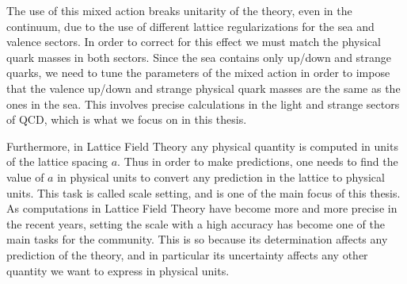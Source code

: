 The use of this mixed action breaks unitarity of the theory, even in the continuum, due to the use of different lattice regularizations for the sea and valence sectors. In order to correct for this effect we must match the physical quark masses in both sectors. Since the sea contains only up/down and strange quarks, we need to tune the parameters of the mixed action in order to impose that the valence up/down and strange physical quark masses are the same as the ones in the sea. This involves precise calculations in the light and strange sectors of QCD, which is what we focus on in this thesis.

Furthermore, in Lattice Field Theory any physical quantity is computed in units of the lattice spacing $a$. Thus in order to make predictions, one needs to find the value of $a$ in physical units to convert any prediction in the lattice to physical units. This task is called scale setting, and is one of the main focus of this thesis. As computations in Lattice Field Theory have become more and more precise in the recent years, setting the scale with a high accuracy has become one of the main tasks for the community. This is so because its determination affects any prediction of the theory, and in particular its uncertainty affects any other quantity we want to express in physical units.

